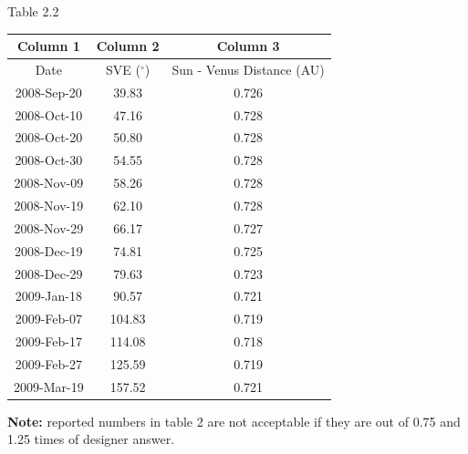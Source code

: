 \begin{center}
Table 2.2

\begin{tabular}{|c|c|c|}
\hline
Column 1 & Column 2 & Column 3\\
\hline
Date & SVE ($^\circ$) & Sun - Venus Distance (AU)\\
\hline
2008-Sep-20 & 39.83 & 0.726\\
\hline
2008-Oct-10 & 47.16 & 0.728\\
\hline
2008-Oct-20 & 50.80 & 0.728\\
\hline
2008-Oct-30 & 54.55 & 0.728\\
\hline
2008-Nov-09 & 58.26 & 0.728\\
\hline
2008-Nov-19 & 62.10 & 0.728\\
\hline
2008-Nov-29 & 66.17 & 0.727\\
\hline
2008-Dec-19 & 74.81 & 0.725\\
\hline
2008-Dec-29 & 79.63 & 0.723\\
\hline
2009-Jan-18 & 90.57 & 0.721\\
\hline
2009-Feb-07 & 104.83 & 0.719\\
\hline
2009-Feb-17 & 114.08 & 0.718\\
\hline
2009-Feb-27 & 125.59 & 0.719\\
\hline
2009-Mar-19 & 157.52 & 0.721\\
\hline
\end{tabular}
\end{center}

\textbf{Note:} reported numbers in table 2 are not acceptable if they are out of 0.75 and
1.25 times of designer answer.
